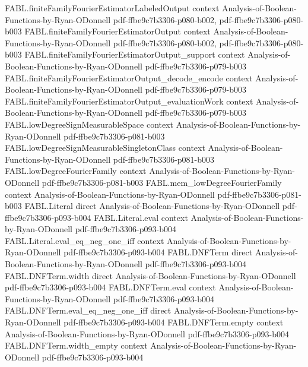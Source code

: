 \begin{theorem}
\proofstep
  {FABL.finiteFamilyFourierEstimatorLabeledOutput}
  {context}
  {Analysis-of-Boolean-Functions-by-Ryan-ODonnell}
  {pdf-ffbe9c7b3306-p080-b002,
    pdf-ffbe9c7b3306-p080-b003}
\proofstep
  {FABL.finiteFamilyFourierEstimatorOutput}
  {context}
  {Analysis-of-Boolean-Functions-by-Ryan-ODonnell}
  {pdf-ffbe9c7b3306-p080-b002,
    pdf-ffbe9c7b3306-p080-b003}
\proofstep
  {FABL.finiteFamilyFourierEstimatorOutput_support}
  {context}
  {Analysis-of-Boolean-Functions-by-Ryan-ODonnell}
  {pdf-ffbe9c7b3306-p079-b003}
\proofstep
  {FABL.finiteFamilyFourierEstimatorOutput_decode_encode}
  {context}
  {Analysis-of-Boolean-Functions-by-Ryan-ODonnell}
  {pdf-ffbe9c7b3306-p079-b003}
\proofstep
  {FABL.finiteFamilyFourierEstimatorOutput_evaluationWork}
  {context}
  {Analysis-of-Boolean-Functions-by-Ryan-ODonnell}
  {pdf-ffbe9c7b3306-p079-b003}
\proofstep
  {FABL.lowDegreeSignMeasurableSpace}
  {context}
  {Analysis-of-Boolean-Functions-by-Ryan-ODonnell}
  {pdf-ffbe9c7b3306-p081-b003}
\proofstep
  {FABL.lowDegreeSignMeasurableSingletonClass}
  {context}
  {Analysis-of-Boolean-Functions-by-Ryan-ODonnell}
  {pdf-ffbe9c7b3306-p081-b003}
\proofstep
  {FABL.lowDegreeFourierFamily}
  {context}
  {Analysis-of-Boolean-Functions-by-Ryan-ODonnell}
  {pdf-ffbe9c7b3306-p081-b003}
\proofstep
  {FABL.mem_lowDegreeFourierFamily}
  {context}
  {Analysis-of-Boolean-Functions-by-Ryan-ODonnell}
  {pdf-ffbe9c7b3306-p081-b003}
\proofstep
  {FABL.Literal}
  {direct}
  {Analysis-of-Boolean-Functions-by-Ryan-ODonnell}
  {pdf-ffbe9c7b3306-p093-b004}
\proofstep
  {FABL.Literal.eval}
  {context}
  {Analysis-of-Boolean-Functions-by-Ryan-ODonnell}
  {pdf-ffbe9c7b3306-p093-b004}
\proofstep
  {FABL.Literal.eval_eq_neg_one_iff}
  {context}
  {Analysis-of-Boolean-Functions-by-Ryan-ODonnell}
  {pdf-ffbe9c7b3306-p093-b004}
\proofstep
  {FABL.DNFTerm}
  {direct}
  {Analysis-of-Boolean-Functions-by-Ryan-ODonnell}
  {pdf-ffbe9c7b3306-p093-b004}
\proofstep
  {FABL.DNFTerm.width}
  {direct}
  {Analysis-of-Boolean-Functions-by-Ryan-ODonnell}
  {pdf-ffbe9c7b3306-p093-b004}
\proofstep
  {FABL.DNFTerm.eval}
  {context}
  {Analysis-of-Boolean-Functions-by-Ryan-ODonnell}
  {pdf-ffbe9c7b3306-p093-b004}
\proofstep
  {FABL.DNFTerm.eval_eq_neg_one_iff}
  {direct}
  {Analysis-of-Boolean-Functions-by-Ryan-ODonnell}
  {pdf-ffbe9c7b3306-p093-b004}
\proofstep
  {FABL.DNFTerm.empty}
  {context}
  {Analysis-of-Boolean-Functions-by-Ryan-ODonnell}
  {pdf-ffbe9c7b3306-p093-b004}
\proofstep
  {FABL.DNFTerm.width_empty}
  {context}
  {Analysis-of-Boolean-Functions-by-Ryan-ODonnell}
  {pdf-ffbe9c7b3306-p093-b004}
\proofstep

\end{theorem}
